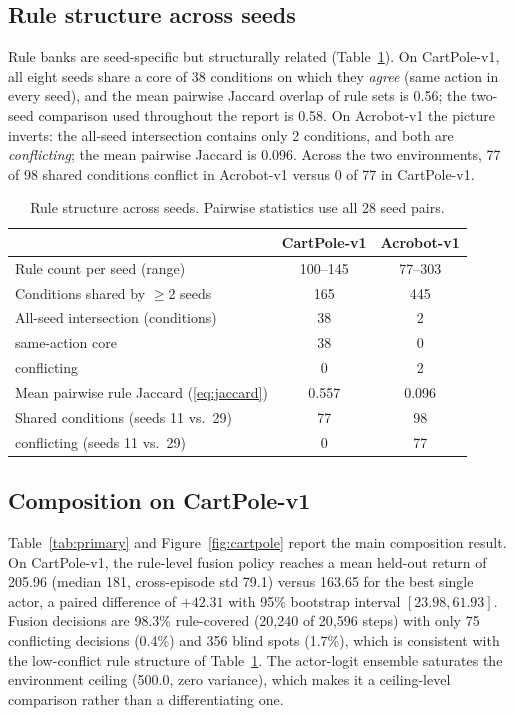 \documentclass[11pt]{article}
\begin{document}
\subsection{Rule structure across seeds}
\label{sec:experiments:structure}

Rule banks are seed-specific but structurally related (Table~\ref{tab:structure}). On CartPole-v1,
all eight seeds share a core of 38 conditions on which they \emph{agree} (same action in every
seed), and the mean pairwise Jaccard overlap of rule sets is 0.56; the two-seed comparison used
throughout the report is 0.58. On Acrobot-v1 the picture inverts: the all-seed intersection contains
only 2 conditions, and both are \emph{conflicting}; the mean pairwise Jaccard is 0.096. Across the
two environments, 77 of 98 shared conditions conflict in Acrobot-v1 versus 0 of 77 in CartPole-v1.

\begin{table}[t]
\centering
\caption{Rule structure across seeds. Pairwise statistics use all 28 seed pairs.}
\label{tab:structure}
\begin{tabular}{lcc}
\toprule
 & CartPole-v1 & Acrobot-v1 \\
\midrule
Rule count per seed (range) & 100--145 & 77--303 \\
Conditions shared by $\ge$2 seeds & 165 & 445 \\
All-seed intersection (conditions) & 38 & 2 \\
\quad same-action core & 38 & 0 \\
\quad conflicting & 0 & 2 \\
Mean pairwise rule Jaccard (\ref{eq:jaccard}) & 0.557 & 0.096 \\
Shared conditions (seeds 11 vs.\ 29) & 77 & 98 \\
\quad conflicting (seeds 11 vs.\ 29) & 0 & 77 \\
\bottomrule
\end{tabular}
\end{table}

\subsection{Composition on CartPole-v1}
\label{sec:experiments:cartpole}

Table~\ref{tab:primary} and Figure~\ref{fig:cartpole} report the main composition result. On
CartPole-v1, the rule-level fusion policy reaches a mean held-out return of 205.96 (median 181,
cross-episode std 79.1) versus 163.65 for the best single actor, a paired difference of $+42.31$
with 95\% bootstrap interval $[23.98,61.93]$. Fusion decisions are 98.3\% rule-covered (20{,}240 of
20{,}596 steps) with only 75 conflicting decisions (0.4\%) and 356 blind spots (1.7\%), which is
consistent with the low-conflict rule structure of Table~\ref{tab:structure}. The actor-logit
ensemble saturates the environment ceiling (500.0, zero variance), which makes it a ceiling-level
comparison rather than a differentiating one.
\end{document}
